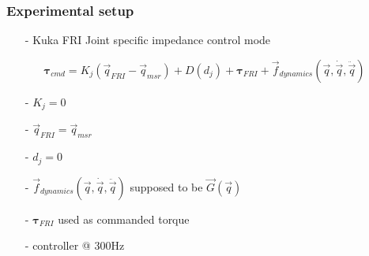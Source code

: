 \begin{frame}
  \frametitle{Experimental setup}
  \begin{itemize}
  \item[-] Kuka FRI Joint specific impedance control mode
    \begin{itemize}
    \item[] $\boldsymbol{\tau}_{cmd} = K_j(\vec{q}_{FRI} - \vec{q}_{msr}) + D(d_{j}) + \boldsymbol{\tau}_{FRI} + \vec{f}_{dynamics}(\vec{q}, \dot{\vec{q}}, \ddot{\vec{q}})$
    \end{itemize}
  \item[-] $K_j = 0$
  \item[-] $\vec{q}_{FRI} = \vec{q}_{msr}$
  \item[-] $d_{j} = 0$
  \item[-] $\vec{f}_{dynamics}(\vec{q}, \dot{\vec{q}}, \ddot{\vec{q}})$ supposed to be $\vec{G}(\vec{q})$
  \item[-] $\boldsymbol{\tau}_{FRI}$ used as commanded torque
  \item[-] controller @ $300$Hz
  \end{itemize}
\end{frame}

